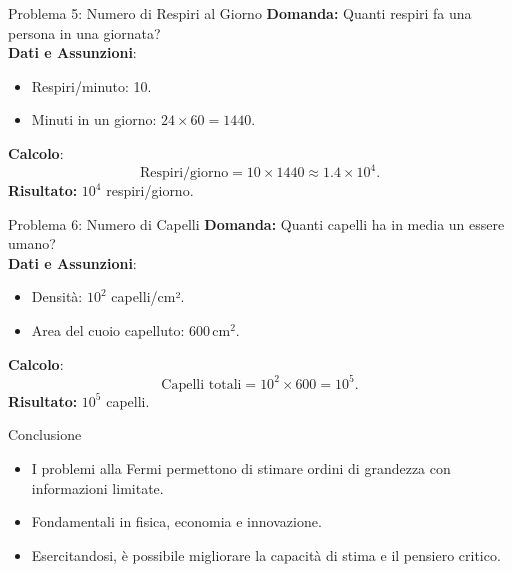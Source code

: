 \documentclass{beamer}
\begin{document}
\begin{frame}{Problema 5: Numero di Respiri al Giorno}
    \textbf{Domanda:} Quanti respiri fa una persona in una giornata? \\
    \vspace{1em}
    \textbf{Dati e Assunzioni}:
    \begin{itemize}
        \item Respiri/minuto: 10. \pause
        \item Minuti in un giorno: $24 \times 60 = 1440$.
    \end{itemize}
    \pause
    \textbf{Calcolo}:
    \[
    \text{Respiri/giorno} = 10 \times 1440 \approx 1.4 \times 10^4.
    \]
    \pause
    \textbf{Risultato:} $10^4$ respiri/giorno.
\end{frame}

\begin{frame}{Problema 6: Numero di Capelli}
    \textbf{Domanda:} Quanti capelli ha in media un essere umano? \\
    \vspace{1em}
    \textbf{Dati e Assunzioni}:
    \begin{itemize}
        \item Densità: $10^2$ capelli/cm². \pause
        \item Area del cuoio capelluto: $600 \, \text{cm}^2$.
    \end{itemize}
    \pause
    \textbf{Calcolo}:
    \[
    \text{Capelli totali} = 10^2 \times 600 = 10^5.
    \]
    \pause
    \textbf{Risultato:} $10^5$ capelli.
\end{frame}

\begin{frame}{Conclusione}
    \begin{itemize}
        \item I problemi alla Fermi permettono di stimare ordini di grandezza con informazioni limitate. \pause
        \item Fondamentali in fisica, economia e innovazione. \pause
        \item Esercitandosi, è possibile migliorare la capacità di stima e il pensiero critico.
    \end{itemize}
\end{frame}
\end{document}
